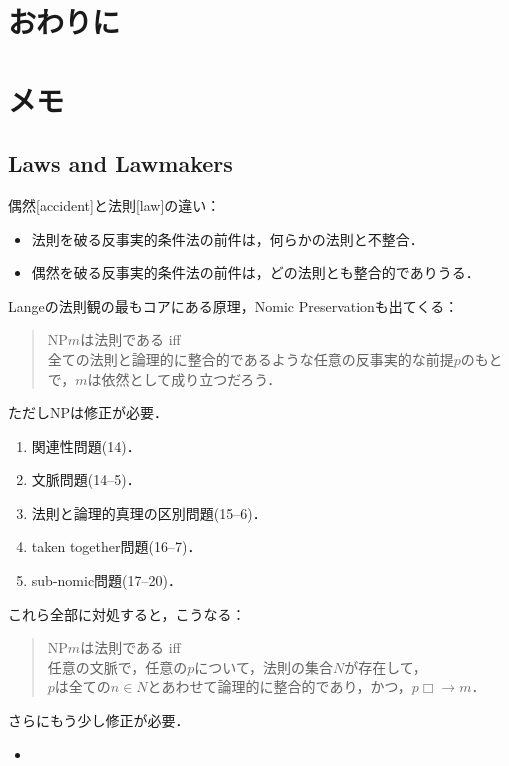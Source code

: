 \documentclass[dvipdfmx,twoside,11pt,uplatex]{jsarticle}
\theoremstyle{definition}
\begin{document}
\section{おわりに}

\section{メモ}
\cite{Lange2009a,Lange2009b,Lange2010,Lange2011,Lange2012,Lange2013a,Lange2013b,Lange2013c,Lange2014,Lange2015,Lange2016,Lange2018a,Lange2018b}

\subsection{Laws and Lawmakers}
偶然[accident]と法則[law]の違い\citep[13]{Lange2009lawmakers}：
\begin{itemize}
    \item 法則を破る反事実的条件法の前件は，何らかの法則と不整合．
    \item 偶然を破る反事実的条件法の前件は，どの法則とも整合的でありうる．
\end{itemize}

Langeの法則観の最もコアにある原理，Nomic Preservationも出てくる\citep[13]{Lange2009lawmakers}：
\begin{quote}
    NP\quad $m$は法則である iff\\
    全ての法則と論理的に整合的であるような任意の反事実的な前提$p$のもとで，$m$は依然として成り立つだろう．
\end{quote}
ただしNPは修正が必要．
\begin{enumerate}
    \item 関連性問題(14)．
    \item 文脈問題(14--5)．
    \item 法則と論理的真理の区別問題(15--6)．
    \item taken together問題(16--7)．
    \item sub-nomic問題(17--20)．
\end{enumerate}
これら全部に対処すると，こうなる\citep[20]{Lange2009lawmakers}：
\begin{quote}
    NP\quad $m$は法則である iff \\
    任意の文脈で，任意の$p$について，法則の集合$N$が存在して，\\
    $p$は全ての$n\in N$とあわせて論理的に整合的であり，かつ，$p\Box\rightarrow m$．
\end{quote}

さらにもう少し修正が必要．
\begin{itemize}
    \item 
\end{itemize}
\end{document}
